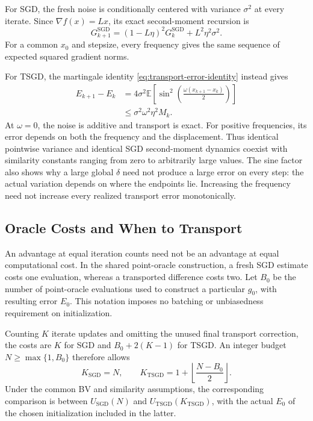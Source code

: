 For SGD, the fresh noise is conditionally centered with variance
$\sigma^2$ at every iterate. Since $\nabla f(x)=Lx$, its exact
second-moment recursion is
\begin{equation}
\label{eq:phase-sgd-dynamics}
G_{k+1}^{\mathrm{SGD}}
=(1-L\eta)^2G_k^{\mathrm{SGD}}+L^2\eta^2\sigma^2.
\end{equation}
For a common $x_0$ and stepsize, every frequency gives the same
sequence of expected squared gradient norms.

For TSGD, the martingale identity
\eqref{eq:transport-error-identity} instead gives
\begin{equation}
\label{eq:phase-tsgd-error}
\begin{aligned}
E_{k+1}-E_k
&=4\sigma^2\mathbb E\!\left[
\sin^2\!\left(\frac{\omega(x_{k+1}-x_k)}2\right)\right]\\
&\leq\sigma^2\omega^2\eta^2M_k.
\end{aligned}
\end{equation}
At $\omega=0$, the noise is additive and transport is exact.
For positive frequencies, its error depends on both the frequency
and the displacement. Thus identical pointwise variance and
identical SGD second-moment dynamics coexist with similarity
constants ranging from zero to arbitrarily large values.
The sine factor also shows why a large global $\delta$ need not
produce a large error on every step: the actual variation depends
on where the endpoints lie. Increasing the frequency need not
increase every realized transport error monotonically.

\subsection{Oracle Costs and When to Transport}
\label{subsec:fair-oracle-comparison}

An advantage at equal iteration counts need not be an advantage at
equal computational cost. In the shared point-oracle construction,
a fresh SGD estimate costs one evaluation, whereas a transported
difference costs two. Let $B_0$ be the number of point-oracle
evaluations used to construct a particular $g_0$, with resulting
error $E_0$. This notation imposes no batching or unbiasedness
requirement on initialization.

Counting $K$ iterate updates and omitting the unused final transport
correction, the costs are $K$ for SGD and $B_0+2(K-1)$ for TSGD.
An integer budget $N\geq\max\{1,B_0\}$ therefore allows
\begin{equation}
\label{eq:equal-budget-horizons}
K_{\mathrm{SGD}}=N,\qquad
K_{\mathrm{TSGD}}=1+\left\lfloor\frac{N-B_0}{2}\right\rfloor.
\end{equation}
Under the common BV and similarity assumptions, the corresponding
comparison is between $U_{\mathrm{SGD}}(N)$ and
$U_{\mathrm{TSGD}}(K_{\mathrm{TSGD}})$, with the actual $E_0$
of the chosen initialization included in the latter.

